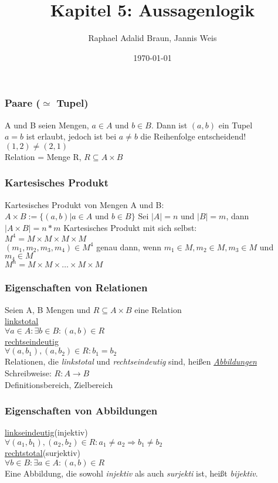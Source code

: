 \documentclass{beamer}
\title{Kapitel 5: Aussagenlogik}
\author{Raphael Adalid Braun, Jannis Weis}
\date{\today}
\institute{KIT - Karlruher Institut für Technologie}
\begin{document}
	\begin{frame}
		\frametitle{Paare ($\simeq$ Tupel)}
		A und B seien Mengen, $a\in A$ und $b\in B$.
		Dann ist $(a,b)$ ein Tupel\\
		$a = b$ ist erlaubt, jedoch ist bei $ a\neq b$ die Reihenfolge entscheidend! $(1, 2) \neq (2, 1)$\\
		Relation = Menge R, $R\subseteq A\times B$
	\end{frame}
	\begin{frame}
		\frametitle{Kartesisches Produkt}
		Kartesisches Produkt von Mengen A und B:\\
		$A \times B := \{ (a, b)\vert a\in A$ und $b\in B\}$
		Sei $\lvert A\rvert = n$ und $\lvert B\rvert = m$, dann $\lvert A\times B\rvert = n * m$
		Kartesisches Produkt mit sich selbst:\\
		$M^{4} = M\times M\times M\times M$\\
		$(m_{1}, m_{2}, m_{3}, m_{4})\in M^{4}$ genau dann, wenn $m_{1}\in M, m_{2}\in M, m_{3}\in M$ und $m_{4}\in M$\\
		$M^{n} = M \times M\times\dots\times M\times M$
	\end{frame}
	\begin{frame}
		\frametitle{Eigenschaften von Relationen}
		Seien A, B Mengen und $R\subseteq A\times B$ eine Relation\\
		\underline{linkstotal}\\
		$\forall a\in A:\exists b\in B: (a,b)\in R$\\
		\underline{rechtseindeutig}\\
		$\forall (a, b_{1}), (a, b_{2})\in R: b_{1} = b_{2}$\\
		
		Relationen, die \emph{linkstotal} und \emph{rechtseindeutig} sind, heißen \emph{\underline{Abbildungen}}\\
		Schreibweise: $R: A\longrightarrow B$\\
		Definitionsbereich, Zielbereich %
	\end{frame}
	\begin{frame}
		\frametitle{Eigenschaften von Abbildungen}
		\underline{linkseindeutig}(injektiv)\\
		$\forall (a_{1}, b_{1}), (a_{2}, b_{2})\in R: a_{1} \neq a_{2}\Rightarrow b_{1} \neq b_{2}$\\%
		\underline{rechtstotal}(surjektiv)\\
		$\forall b\in B: \exists a\in A: (a, b)\in R$\\
		Eine Abbildung, die  sowohl \emph {injektiv} als auch \emph{surjekti} ist, heißt \emph{bijektiv}.
	\end{frame}
	
\end{document}

